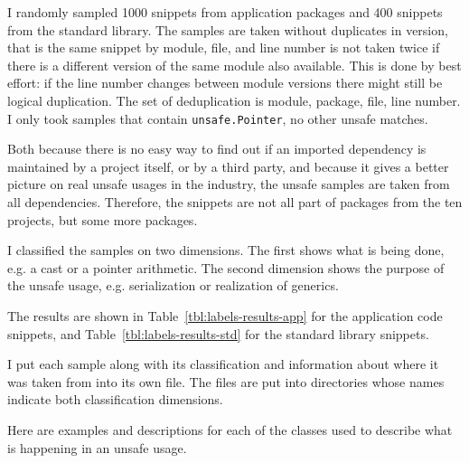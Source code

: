 I randomly sampled 1000 snippets from application packages and 400 snippets from the standard library.
The samples are taken without duplicates in version, that is the same snippet by module, file, and line number is not
taken twice if there is a different version of the same module also available.
This is done by best effort: if the line number changes between module versions there might still be logical
duplication.
The set of deduplication is module, package, file, line number.
I only took samples that contain \texttt{unsafe.Pointer}, no other unsafe matches.

Both because there is no easy way to find out if an imported dependency is maintained by a project itself, or by a
third party, and because it gives a better picture on real unsafe usages in the industry, the unsafe samples are taken
from all dependencies.
Therefore, the snippets are not all part of packages from the ten projects, but some more packages.

I classified the samples on two dimensions.
The first shows what is being done, e.g. a cast or a pointer arithmetic.
The second dimension shows the purpose of the unsafe usage, e.g. serialization or realization of generics.

The results are shown in Table~\ref{tbl:labels-results-app} for the application code snippets, and
Table~\ref{tbl:labels-results-std} for the standard library snippets.



I put each sample along with its classification and information about where it was taken from into its own file.
The files are put into directories whose names indicate both classification dimensions.

Here are examples and descriptions for each of the classes used to describe what is happening in an unsafe usage.





